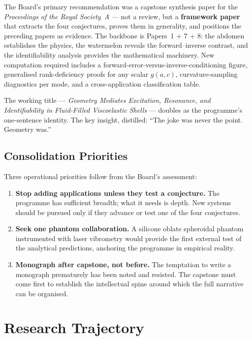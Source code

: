 \documentclass[11pt,a4paper]{article}
\begin{document}
The Board's primary recommendation was a capstone synthesis paper for the \emph{Proceedings of the Royal Society~A} --- not a review, but a \textbf{framework paper} that extracts the four conjectures, proves them in generality, and positions the preceding papers as evidence. The backbone is Papers~1 + 7 + 8: the abdomen establishes the physics, the watermelon reveals the forward--inverse contrast, and the identifiability analysis provides the mathematical machinery. New computation required includes a forward-error-versus-inverse-conditioning figure, generalised rank-deficiency proofs for any scalar $g(a,c)$, curvature-sampling diagnostics per mode, and a cross-application classification table.

The working title --- \emph{Geometry Mediates Excitation, Resonance, and Identifiability in Fluid-Filled Viscoelastic Shells} --- doubles as the programme's one-sentence identity. The key insight, distilled: ``The joke was never the point. Geometry was.''

\subsection{Consolidation Priorities}

Three operational priorities follow from the Board's assessment:

\begin{enumerate}[leftmargin=*]
  \item \textbf{Stop adding applications unless they test a conjecture.} The programme has sufficient breadth; what it needs is depth. New systems should be pursued only if they advance or test one of the four conjectures.
  \item \textbf{Seek one phantom collaboration.} A silicone oblate spheroidal phantom instrumented with laser vibrometry would provide the first external test of the analytical predictions, anchoring the programme in empirical reality.
  \item \textbf{Monograph after capstone, not before.} The temptation to write a monograph prematurely has been noted and resisted. The capstone must come first to establish the intellectual spine around which the full narrative can be organised.
\end{enumerate}

\section{Research Trajectory}
\end{document}
